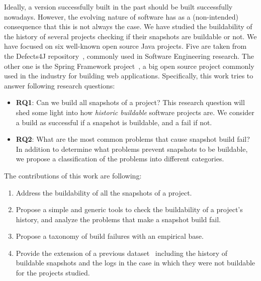Ideally, a version successfully built in the past should be built successfully nowadays.
However, the evolving nature of software has as a (non-intended) consequence that this is not always the case.
We have studied the buildability of the history of several projects checking if their snapshots are buildable or not.
We have focused on six well-known open source Java projects.
Five are taken from the Defects4J repository~\cite{Just:2014:DDE:2610384.2628055}, commonly used in Software Engineering research.
The other one is the Spring Framework project~\cite{Spring:2019:Online}, a big open source project commonly used in the industry for building web applications.
Specifically, this work tries to answer following research questions:

\begin{itemize}
	\item \textbf{RQ1}: Can we build all snapshots of a project? 
    This research question will shed some light into how \emph{historic buildable} software projects are. We consider a build as successful if a snapshot is buildable, and a fail if not.
	\item \textbf{RQ2}:  What are the most common problems that cause snapshot build fail?
    In addition to determine what problems prevent snapshots to be buildable, we propose a classification of the problems into different categories.
\end{itemize}

The contributions of this work are following:
    
\begin{enumerate}
	\item Address the buildability of all the snapshots of a project.
	\item Propose a simple and generic tools to check the buildability of a project's history, and analyze the problems that make a snapshot build fail.
	\item Propose a taxonomy of build failures with an empirical base.
	\item Provide the extension of a previous dataset~\cite{Just:2014:DDE:2610384.2628055} including the history of buildable snapshots and the logs in the case in which they were not buildable for the projects studied.
\end{enumerate}
